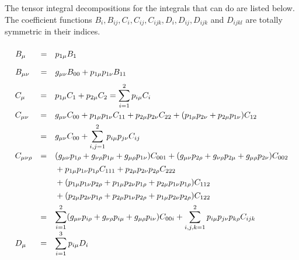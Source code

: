The tensor integral decompositions for the integrals that \fc can
do are listed below. The coefficient functions $B_i, B_{ij},
C_i, C_{ij}, C_{ijk}, D_i, D_{ij}, D_{ijk}$ and $D_{ijkl}$
are totally symmetric in their indices.

\[
\begin{array}{lll}
\hphantom{C_{\mu \nu \rho }} &&
\hphantom{\mbox{}(g_{\mu \nu }p_{1\rho }+g_{\nu \rho }p_{1\mu }+
g_{\mu \rho }p_{1\nu }) C_{001} + (g_{\mu \nu }p_{2\rho }+g_{\nu \rho }
p_{2\mu }+ g_{\mu \rho }p_{2\nu }) C_{002}}\\[-.7em]
B_{\mu } & = & p_{1\mu } B_{1} \\[1em]
B_{\mu \nu } & = & g_{\mu \nu } B_{00} + p_{1\mu } p_{1\nu } B_{11}
\end{array}
\]
\[
\begin{array}{lll}
C_{\mu } & = & p_{1\mu } C_{1} + p_{2\mu } C_{2}
= \displaystyle\sum_{i=1}^{2} p_{i\mu} C_{i} \\[1.2em]
C_{\mu \nu } & = & g_{\mu \nu }C_{00} + p_{1\mu }p_{1\nu }C_{11} + p_{2\mu}
p_{2\nu }C_{22} +(p_{1\mu }p_{2\nu }+p_{2\mu }p_{1\nu }) C_{12} \\[1ex]
&=& g_{\mu \nu }C_{00} +
\displaystyle\sum_{i,j=1}^{2} p_{i\mu} p_{j\nu }C_{ij} \\[1.2em]
C_{\mu \nu \rho } &=& \mbox{}(g_{\mu \nu }p_{1\rho }+g_{\nu \rho }p_{1\mu }+
g_{\mu \rho }p_{1\nu }) C_{001} + (g_{\mu \nu }p_{2\rho }+g_{\nu \rho }
p_{2\mu }+ g_{\mu \rho }p_{2\nu }) C_{002}  \\[1ex]
&&\mbox{} + p_{1\mu }p_{1\nu }p_{1\rho } C_{111}
+ p_{2\mu }p_{2\nu }p_{2\rho } C_{222} \\[1ex]
&&\mbox{} +(p_{1\mu }p_{1\nu }p_{2\rho }+
p_{1\mu }p_{2\nu }p_{1\rho }+
p_{2\mu }p_{1\nu }p_{1\rho }  ) C_{112} \\[1ex]
&&\mbox{} +(p_{2\mu }p_{2\nu }p_{1\rho } + p_{2\mu }p_{1\nu }p_{2\rho }+
p_{1\mu }p_{2\nu }p_{2\rho } ) C_{122} \\[1ex]
&=& \displaystyle\sum_{i=1}^{2}(g_{\mu \nu }p_{i\rho }+g_{\nu \rho }p_{i\mu }
+ g_{\mu \rho }p_{i\nu }) C_{00i}
+ \displaystyle \sum_{i,j,k=1}^{2} p_{i\mu} p_{j\nu }p_{k\rho}C_{ijk} \\[1ex]
D_{\mu } &=& \displaystyle\sum_{i=1}^{3} p_{i\mu} D_{i} \\[1em]

\end{array}\]
